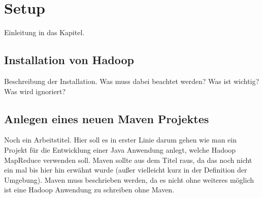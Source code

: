 
\chapter{Setup}\label{cha:Setup}
Einleitung in das Kapitel.

\section{Installation von Hadoop}
Beschreibung der Installation. Was muss dabei beachtet werden? Was ist wichtig? Was wird ignoriert?

\section{Anlegen eines neuen Maven Projektes}
Noch ein Arbeitstitel. Hier soll es in erster Linie darum gehen wie man ein Projekt für die Entwicklung einer Java Anwendung anlegt, welche Hadoop MapReduce verwenden soll. Maven sollte aus dem Titel raus, da das noch nicht ein mal bis hier hin erwähnt wurde (außer vielleicht kurz in der Definition der Umgebung). Maven muss beschrieben werden, da es nicht ohne weiteres möglich ist eine Hadoop Anwendung zu schreiben ohne Maven.